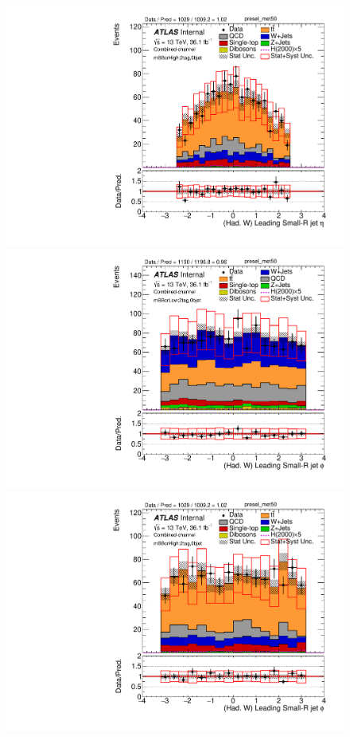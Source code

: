 \begin{figure}[!ht]
\begin{center}
\includegraphics[scale=0.33]{./figures/boosted/PlotByMbbRegions/DataMC_2tag_0bjet_mbbcrHigh_lepton_presel_met50_LightJet1Eta}                                                                       
\includegraphics[scale=0.33]{./figures/boosted/PlotByMbbRegions/DataMC_2tag_0bjet_mbbcrLow_lepton_presel_met50_LightJet1Phi}                                                                        
\includegraphics[scale=0.33]{./figures/boosted/PlotByMbbRegions/DataMC_2tag_0bjet_mbbcrHigh_lepton_presel_met50_LightJet1Phi}                                                                       

\end{center}
\end{figure}
